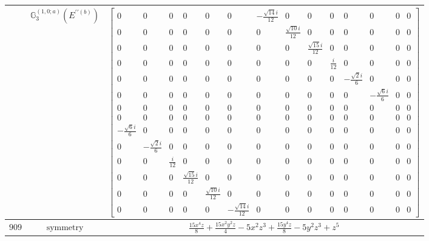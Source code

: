 \documentclass[fleqn,8pt,landscape]{jsarticle}
\begin{document}
\begin{longtable}{ccc}
$  $ & $ \mathbb{G}_{3}^{(1,0;a)}(E^{\prime\prime(b)}) $ & $ \begin{bmatrix} 0 & 0 & 0 & 0 & 0 & 0 & - \frac{\sqrt{14} i}{12} & 0 & 0 & 0 & 0 & 0 & 0 & 0 \\ 0 & 0 & 0 & 0 & 0 & 0 & 0 & \frac{\sqrt{10} i}{12} & 0 & 0 & 0 & 0 & 0 & 0 \\ 0 & 0 & 0 & 0 & 0 & 0 & 0 & 0 & \frac{\sqrt{15} i}{12} & 0 & 0 & 0 & 0 & 0 \\ 0 & 0 & 0 & 0 & 0 & 0 & 0 & 0 & 0 & \frac{i}{12} & 0 & 0 & 0 & 0 \\ 0 & 0 & 0 & 0 & 0 & 0 & 0 & 0 & 0 & 0 & - \frac{\sqrt{2} i}{6} & 0 & 0 & 0 \\ 0 & 0 & 0 & 0 & 0 & 0 & 0 & 0 & 0 & 0 & 0 & - \frac{\sqrt{6} i}{6} & 0 & 0 \\ 0 & 0 & 0 & 0 & 0 & 0 & 0 & 0 & 0 & 0 & 0 & 0 & 0 & 0 \\ 0 & 0 & 0 & 0 & 0 & 0 & 0 & 0 & 0 & 0 & 0 & 0 & 0 & 0 \\ - \frac{\sqrt{6} i}{6} & 0 & 0 & 0 & 0 & 0 & 0 & 0 & 0 & 0 & 0 & 0 & 0 & 0 \\ 0 & - \frac{\sqrt{2} i}{6} & 0 & 0 & 0 & 0 & 0 & 0 & 0 & 0 & 0 & 0 & 0 & 0 \\ 0 & 0 & \frac{i}{12} & 0 & 0 & 0 & 0 & 0 & 0 & 0 & 0 & 0 & 0 & 0 \\ 0 & 0 & 0 & \frac{\sqrt{15} i}{12} & 0 & 0 & 0 & 0 & 0 & 0 & 0 & 0 & 0 & 0 \\ 0 & 0 & 0 & 0 & \frac{\sqrt{10} i}{12} & 0 & 0 & 0 & 0 & 0 & 0 & 0 & 0 & 0 \\ 0 & 0 & 0 & 0 & 0 & - \frac{\sqrt{14} i}{12} & 0 & 0 & 0 & 0 & 0 & 0 & 0 & 0 \end{bmatrix} $ \\ \hline
$ 909 $ & $ \text{symmetry} $ & $ \frac{15 x^{4} z}{8} + \frac{15 x^{2} y^{2} z}{4} - 5 x^{2} z^{3} + \frac{15 y^{4} z}{8} - 5 y^{2} z^{3} + z^{5} $ \\

\end{longtable}
\end{document}
